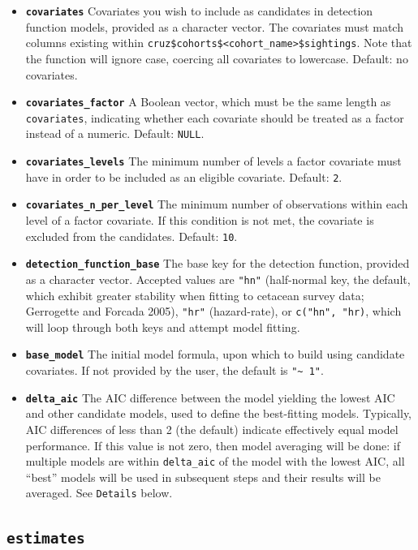 \documentclass[
]{book}
\begin{document}
\begin{itemize}
\item
  \textbf{\texttt{covariates}} Covariates you wish to include as candidates in detection function models, provided as a character vector. The covariates must match columns existing within \texttt{cruz\$cohorts\$\textless{}cohort\_name\textgreater{}\$sightings}. Note that the function will ignore case, coercing all covariates to lowercase. Default: no covariates.
\item
  \textbf{\texttt{covariates\_factor}} A Boolean vector, which must be the same length as \texttt{covariates}, indicating whether each covariate should be treated as a factor instead of a numeric. Default: \texttt{NULL}.
\item
  \textbf{\texttt{covariates\_levels}} The minimum number of levels a factor covariate must have in order to be included as an eligible covariate. Default: \texttt{2}.
\item
  \textbf{\texttt{covariates\_n\_per\_level}} The minimum number of observations within each level of a factor covariate. If this condition is not met, the covariate is excluded from the candidates. Default: \texttt{10}.
\item
  \textbf{\texttt{detection\_function\_base}} The base key for the detection function, provided as a character vector. Accepted values are \texttt{"hn"} (half-normal key, the default, which exhibit greater stability when fitting to cetacean survey data; Gerrogette and Forcada 2005), \texttt{"hr"} (hazard-rate), or \texttt{c("hn",\ "hr)}, which will loop through both keys and attempt model fitting.
\item
  \textbf{\texttt{base\_model}} The initial model formula, upon which to build using candidate covariates. If not provided by the user, the default is \texttt{"\textasciitilde{}\ 1"}.
\item
  \textbf{\texttt{delta\_aic}} The AIC difference between the model yielding the lowest AIC and other candidate models, used to define the best-fitting models. Typically, AIC differences of less than 2 (the default) indicate effectively equal model performance. If this value is not zero, then model averaging will be done: if multiple models are within \texttt{delta\_aic} of the model with the lowest AIC, all ``best'' models will be used in subsequent steps and their results will be averaged. See \texttt{Details} below.
\end{itemize}

\hypertarget{estimates}{%
\subsection*{\texorpdfstring{\texttt{estimates}}{estimates}}\label{estimates}}
\end{document}
